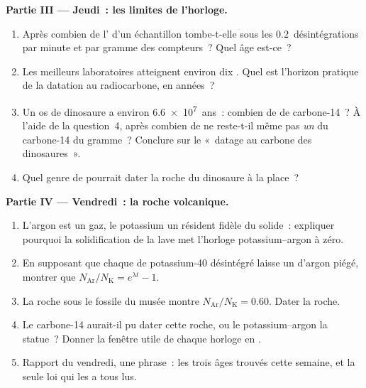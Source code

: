 \begin{problem}
\medskip
\noindent\textbf{Partie III --- Jeudi~: les limites de l'horloge.}
\begin{enumerate}[resume]
  \item Après combien de  l'
        d'un échantillon tombe-t-elle sous les $0.2$~désintégrations
        par minute et par gramme des compteurs~? Quel âge est-ce~?
  \item Les meilleurs laboratoires atteignent environ dix .
        Quel est l'horizon pratique de la datation au radiocarbone,
        en années~?
  \item Un os de dinosaure a environ \num{6.6e7}~ans~: combien de
         de carbone-14~? À l'aide de la question~4, après
        combien de  ne reste-t-il même pas \emph{un}
         du carbone-14 du gramme~?
        Conclure sur le «~datage au carbone des dinosaures~».
  \item Quel genre de  pourrait dater
        la roche du dinosaure à la place~?
\end{enumerate}

\medskip
\noindent\textbf{Partie IV --- Vendredi~: la roche volcanique.}
\begin{enumerate}[resume]
  \item L'argon est un gaz, le potassium un résident fidèle du
        solide~: expliquer pourquoi la solidification de la lave met
        l'horloge potassium--argon à zéro.
  \item En supposant que chaque
         de potassium-40 désintégré
        laisse un  d'argon piégé, montrer
        que $N_{\mathrm{Ar}}/N_{\mathrm K} = e^{\lambda t} - 1$.
  \item La roche sous le fossile du musée montre
        $N_{\mathrm{Ar}}/N_{\mathrm K} = 0.60$. Dater la roche.
  \item Le carbone-14 aurait-il pu dater cette roche, ou le
        potassium--argon la statue~? Donner la fenêtre utile de chaque
        horloge en .
  \item Rapport du vendredi, une phrase~: les trois âges trouvés
        cette semaine, et la seule loi qui les a tous lus.
\end{enumerate}
\end{problem}
